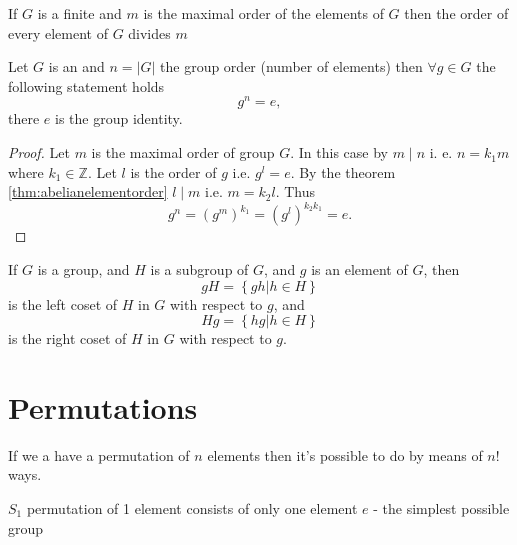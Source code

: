 \begin{appendices}
\begin{theorem}
  If $G$ is a finite  and $m$ is the maximal
  order of the elements of $G$ then the order of every element of $G$
  divides $m$ 
  \label{thm:abelianelementorder}
\end{theorem}

\begin{theorem}
  Let $G$ is an  and $n = \left|G\right|$
  the group order (number of elements) then $\forall g \in G$ the
  following statement holds
  \[
  g^n = e,
  \]
  there $e$ is the group identity.
  \begin{proof}
    Let $m$ is the maximal order of group $G$. In this case by
     $m \mid n$ i. e. $n = k_1 m$ where $k_1 \in
    \mathbb{Z}$. Let $l$ is the order of $g$ i.e. $g^l = e$. By the
    theorem \ref{thm:abelianelementorder} $l \mid m$ i.e. $m = k_2
    l$. Thus
    \[
    g^n = \left(g^m\right)^{k_1} = 
    \left(g^l\right)^{k_2 k_1} = e.
    \]
  \end{proof}
  \label{thm:abelianelement}
\end{theorem}

\begin{definition}[Coset]
  If $G$ is a group, and $H$ is a subgroup of $G$, and $g$ is an
  element of $G$, then
  \[
  gH = \left\{ gh \vert h \in H\right\}
  \]
  is the left coset of $H$ in $G$ with respect to $g$, and
  \[
  Hg = \left\{ hg \vert h \in H\right\}
  \]
  is the right coset of $H$ in $G$ with respect to $g$.
  \label{def:coset}
\end{definition}
  
\section{Permutations}

\begin{example}[$S_n$ group]
  If we a have a permutation of $n$ elements then it's possible to do
  by means of $n!$ ways.
  
  $S_1$ permutation of 1 element consists of only one element $e$ -
  the simplest possible group


\end{example}
\end{appendices}
